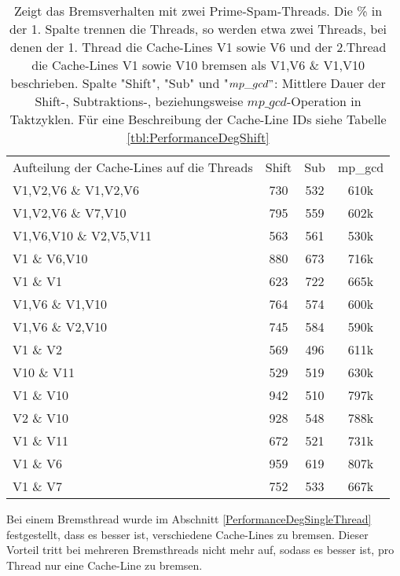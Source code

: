 \begin{table}[h]
\caption{Zeigt das Bremsverhalten mit zwei Prime-Spam-Threads. Die \% in der 1. Spalte trennen die Threads, so werden etwa zwei Threads, bei denen der 1. Thread die Cache-Lines V1 sowie V6 und der 2.Thread die Cache-Lines V1 sowie V10 bremsen als V1,V6 \& V1,V10 beschrieben. Spalte "Shift", "Sub" und "$mp\_gcd"$: Mittlere Dauer der Shift-, Subtraktions-, beziehungsweise $mp\_gcd$-Operation in Taktzyklen. Für eine Beschreibung der Cache-Line IDs siehe Tabelle \ref{tbl:PerformanceDegShift}}
\label{tbl:PerformanceDegShiftMultithreadTwo}
\begin{tabular}{lccc}
Aufteilung der Cache-Lines auf die Threads & Shift & Sub & mp\_gcd \\
V1,V2,V6 \& V1,V2,V6                       & 730   & 532 & 610k    \\
V1,V2,V6 \& V7,V10                         & 795   & 559 & 602k    \\
V1,V6,V10 \& V2,V5,V11                     & 563   & 561 & 530k    \\
V1 \& V6,V10                               & 880   & 673 & 716k    \\
V1 \& V1                                   & 623   & 722 & 665k    \\
V1,V6 \& V1,V10                            & 764   & 574 & 600k    \\
V1,V6 \& V2,V10                            & 745   & 584 & 590k    \\
V1 \& V2                                   & 569   & 496 & 611k    \\
V10 \& V11                                 & 529   & 519 & 630k    \\
V1 \& V10                                  & 942   & 510 & 797k    \\
V2 \& V10                                  & 928   & 548 & 788k    \\
V1 \& V11                                  & 672   & 521 & 731k    \\
V1 \& V6                                   & 959   & 619 & 807k    \\
V1 \& V7                                   & 752   & 533 & 667k    \\
\end{tabular}
\end{table}

Bei einem Bremsthread wurde im Abschnitt \ref{PerformanceDegSingleThread} festgestellt, dass es besser ist, verschiedene Cache-Lines zu bremsen.
Dieser Vorteil tritt bei mehreren Bremsthreads nicht mehr auf, sodass es besser ist, pro Thread nur eine Cache-Line zu bremsen.

